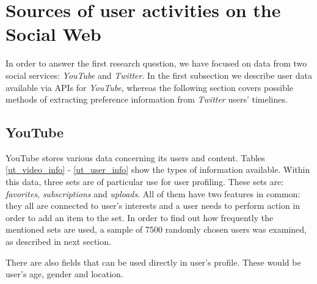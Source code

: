 \section{Sources of user activities on the Social Web}
In order to answer the first research question, we have focused on data from two social services: \textit{YouTube} and \textit{Twitter}. In the first subsection we describe user data available via APIs for \textit{YouTube}, whereas the
following section covers possible methods of extracting preference information from \textit{Twitter} users' timelines.
\subsection{YouTube}
YouTube stores various data concerning its users and content. Tables
\ref{ut_video_info} - \ref{ut_user_info} show the types of information
available. Within this data, three sets are of particular use for user
profiling. These sets are: \emph{favorites}, \emph{subscriptions} and
\emph{uploads}. All of them have two features in common: they all are connected
to user's interests and a user needs to perform action in order to add an item
to the set. In order to find out how frequently the mentioned sets are used, a
sample of 7500 randomly chosen users was examined, as described in next section.

There are also fields that can be used directly in user's profile. These would
be user's age, gender and location.

